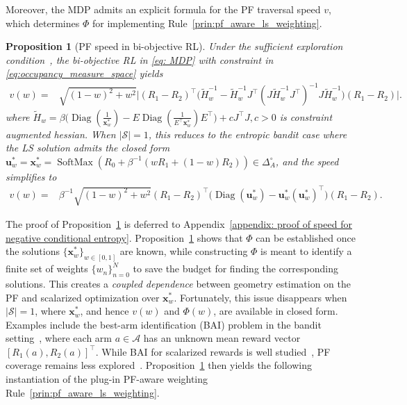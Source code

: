 \documentclass{article}
\newtheorem{proposition}{Proposition}
\newcommand{\bx}{\mathbf{x}}
\newcommand{\bu}{\mathbf{u}}
\newcommand{\Farc}{\Phi}
\newcommand{\Diag}{\operatorname{Diag}}
\newcommand{\SoftMax}{\operatorname{SoftMax}}
\begin{document}
Moreover, the MDP admits an explicit formula for the PF traversal speed $v$, which determines $\Farc$ for implementing Rule~\ref{prin:pf_aware_ls_weighting}.
\begin{proposition}[PF speed in bi-objective RL]
\label{prop: speed for negative conditional entropy}
Under the sufficient exploration condition~\citep{schlaginhaufen2024towards}, the bi-objective RL in \eqref{eq: MDP} with constraint in \eqref{eq:occupancy_measure_space} yields
\begin{align*}
v(w)
= & \sqrt{(1-w)^2+w^2} \Big|(R_1-R_2)^\top \big(\widetilde H_w^{-1}-\widetilde H_w^{-1}J^\top (J\widetilde H_w^{-1}J^\top)^{-1}J\widetilde H_w^{-1} \big)(R_1-R_2) \Big|.
\end{align*}
where $\widetilde H_w =\beta\big(\Diag(\tfrac{1}{\mathbf{x}^*_w})-E\Diag(\tfrac{1}{E^\top\mathbf{x}^*_w})E^\top\big)+cJ^\top J, c>0$ is constraint augmented hessian.
When $|\mathcal S|=1$, this reduces to the entropic bandit case where the LS solution admits the closed form $\bu_w^*=\bx_w^*=\SoftMax\left(R_0+\beta^{-1}(wR_1+(1-w)R_2)\right)\in\Delta_A^\circ$, 
and the speed simplifies to
\begin{align}
v(w) = & \beta^{-1}\sqrt{(1-w)^2+w^2} (R_1-R_2)^\top\big(\Diag(\bu_w^*)-\bu_w^* (\bu_w^*)^\top\big)(R_1-R_2).
\label{eq:bandit_speed}
\end{align}
\end{proposition}
The proof of Proposition~\ref{prop: speed for negative conditional entropy} is deferred to Appendix~\ref{appendix: proof of speed for negative conditional entropy}. 
Proposition~\ref{prop: speed for negative conditional entropy} shows that $\Farc$ can be established once the solutions $\{\bx_w^*\}_{w\in[0,1]}$ are known, while constructing $\Farc$ is meant to identify a finite set of weights $\{w_n\}_{n=0}^N$ to save the budget for finding the corresponding solutions. 
This creates a \textit{coupled dependence} between geometry estimation on the PF and scalarized optimization over $\bx_w^*$.
Fortunately, this issue disappears when $|\mathcal S|=1$, where $\bx_w^*$, and hence $v(w)$ and $\Farc(w)$, are available in closed form. Examples include the best-arm identification (BAI) problem in the bandit setting~\citep{bubeck2009pure,kaufmann2016complexity}, 
where each arm $a\in\mathcal A$ has an unknown mean reward vector $[R_1(a),R_2(a)]^\top$. While BAI for scalarized rewards is well studied~\citep{auer2002finite,yahyaa2015thompson,cheng2025multi}, PF coverage remains less explored~\citep{garivier2024sequential}. Proposition~\ref{prop: speed for negative conditional entropy} then yields the following instantiation of the plug-in PF-aware weighting Rule~\ref{prin:pf_aware_ls_weighting}.
\end{document}
